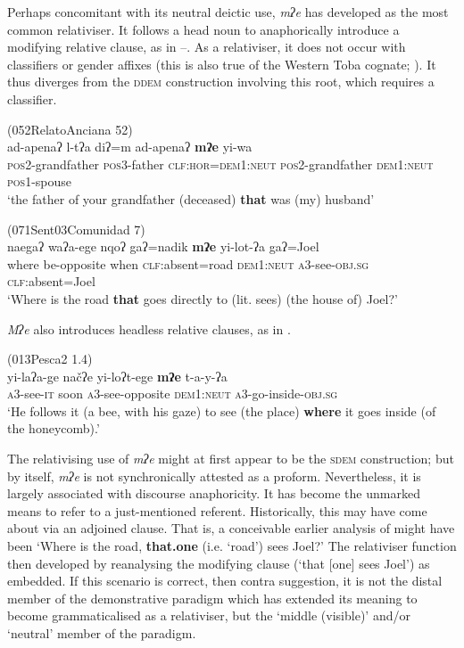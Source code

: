 \documentclass[output=paper,colorlinks,citecolor=brown]{langscibook}
\begin{document}
Perhaps concomitant with its neutral deictic use, \textit{mʔe} has developed as the most common relativiser. It follows a head noun to anaphorically introduce a modifying relative clause, as in –. As a relativiser, it does not occur with classifiers or gender affixes (this is also true of the Western Toba cognate; \citealt[53]{Carpio2012}). It thus diverges from the \textsc{ddem} construction involving this root, which requires a classifier.

\ea\label{ex:payne:87} (052RelatoAnciana 52)\\
\gll  ad-apenaʔ  l-tʔa  diʔ=m ad-apenaʔ  \textbf{mʔe}  yi-wa\\
\textsc{pos2}-grandfather  \textsc{pos3}-father  \textsc{clf:hor=dem1:neut} \textsc{pos2}-grandfather   \textsc{dem1:neut}  \textsc{pos1}-spouse\\
\glt ‘the father of your grandfather (deceased) \textbf{that} was (my) husband’ 
\z

\ea\label{ex:payne:88} (071Sent03Comunidad 7)\\
\gll  naegaʔ  waʔa-ege  nqoʔ  gaʔ=nadik \textbf{mʔe}  yi-lot-ʔa  gaʔ=Joel \\
where be-opposite  when   \textsc{clf}:absent=road \textsc{dem1:neut}  \textsc{a3}-see-\textsc{obj.sg}   \textsc{clf}:absent=Joel\\
\glt ‘Where is the road \textbf{that} goes directly to (lit. sees) (the house of) Joel?’ 
\z

\textit{Mʔe} also introduces headless relative clauses, as in .

\ea\label{ex:payne:89} (013Pesca2 1.4)\\
\gll  yi-laʔa-ge  načʔe  yi-loʔt-ege \textbf{mʔe}  t-a-y-ʔa\\
 \textsc{a3}-see-\textsc{it} soon \textsc{a3}-see-opposite \textsc{dem1:neut}  \textsc{a3}-go-inside-\textsc{obj.sg}\\
\glt ‘He follows it (a bee, with his gaze) to see (the place) \textbf{where} it goes inside (of the honeycomb).’ 
\z

The relativising use of \textit{mʔe} might at first appear to be the \textsc{sdem} construction; but by itself, \textit{mʔe} is not synchronically attested as a proform. Nevertheless, it is largely associated with discourse anaphoricity. It has become the unmarked means to refer to a just-mentioned referent. Historically, this may have come about via an adjoined clause. That is, a conceivable earlier analysis of  might have been ‘Where is the road, \textbf{that.one} (i.e. ‘road’) sees Joel?’ The relativiser function then developed by reanalysing the modifying clause (‘that [one] sees Joel’) as embedded. If this scenario is correct, then contra  suggestion, it is not the distal member of the demonstrative paradigm which has extended its meaning to become grammaticalised as a relativiser, but the ‘middle (visible)’ and/or ‘neutral’ member of the paradigm.
\end{document}
